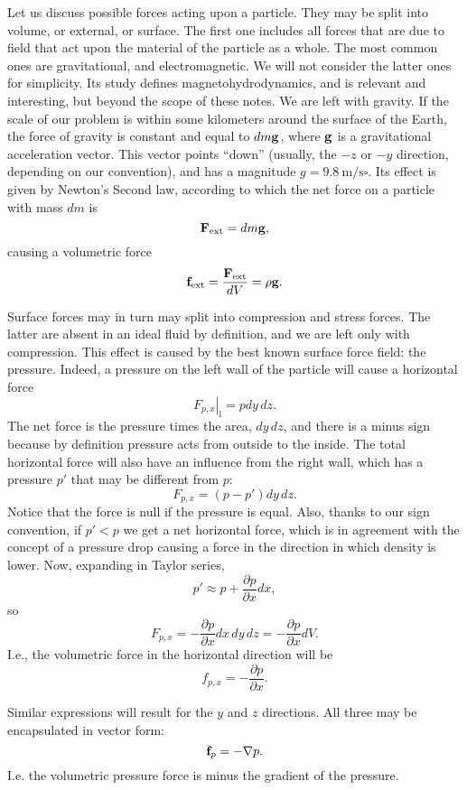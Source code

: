 Let us discuss possible forces acting upon a particle. They may be
split into volume, or external, or surface. The first one includes all
forces that are due to field that act upon the material of the
particle as a whole. The most common ones are gravitational, and
electromagnetic. We will not consider the latter ones for
simplicity. Its study defines magnetohydrodynamics, and is relevant
and interesting, but beyond the scope of these notes. We are left with
gravity. If the scale of our problem is within some kilometers around
the surface of the Earth, the force of gravity is constant and equal
to $dm \mathbf{g}$, where $\mathbf{g}$ is a gravitational acceleration
vector. This vector points ``down'' (usually, the $-z$ or $-y$
direction, depending on our convention), and has a magnitude
$g=\SI{9.8}{\meter\per\second\square}$. Its effect is given by
Newton's Second law, according to which the net force on a particle
with mass $dm$ is
\[
\mathbf{F}_\text{ext} = dm \mathbf{g} ,
\]
causing a volumetric force
\[
\mathbf{f}_\text{ext} = \frac{\mathbf{F}_\text{ext}}{dV}= \rho \mathbf{g} .
\]

Surface forces may in turn may split into compression and stress
forces. The latter are absent in an ideal fluid by definition, and we
are left only with compression. This effect is caused by the best
known surface force field: the pressure. Indeed, a pressure
on the left wall of the particle will cause a horizontal force
\[
\left. F_{p,x} \right|_\text{l} =
  p  dy\, dz .
\]
The net force is the pressure times the area, $dy\,dz$, and there is a
minus sign because by definition pressure acts from outside to the
inside. The total horizontal force will also have an influence from the
right wall, which has a pressure $p'$ that may be different from $p$:
\[
F_{p,x} =  (p - p')  dy\, dz .
\]
Notice that the force is null if the pressure is equal. Also, thanks
to our sign convention, if $p'<p$ we get a net horizontal force, which
is in agreement with the concept of a pressure drop causing a force in
the direction in which density is lower. Now, expanding in Taylor
series,
\[
p' \approx p + \frac{\partial p }{ \partial x} dx ,
\]
so
\[
F_{p,x} =
-  \frac{\partial p }{ \partial x}  dx\, dy\, dz =
-  \frac{\partial p }{ \partial x}  dV .
\]
I.e., the volumetric force in the horizontal direction will be
\[
f_{p,x} = -  \frac{\partial p }{ \partial x} .
\]

Similar expressions will result for the $y$ and $z$ directions. All
three may be encapsulated in vector form:
\[
\mathbf{f}_p = - \nabla p .
\]
I.e. the volumetric pressure force is minus the gradient of the
pressure.

